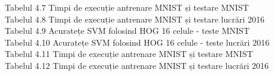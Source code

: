 \documentclass[a4paper,12pt]{report}
\begin{document}
Tabelul 4.7 \hspace{2mm} Timpi de execuție antrenare MNIST și testare MNIST\\  
Tabelul 4.8 \hspace{2mm} Timpi de execuție antrenare MNIST și testare lucrări 2016\\  
Tabelul 4.9 \hspace{2mm} Acuratețe SVM folosind HOG 16 celule - teste MNIST\\  
Tabelul 4.10 \hspace{2mm} Acuratețe SVM folosind HOG 16 celule - teste lucrări 2016\\  
Tabelul 4.11 \hspace{2mm} Timpi de execuție antrenare MNIST și testare MNIST\\  
Tabelul 4.12 \hspace{2mm} Timpi de execuție antrenare MNIST și testare lucrări 2016\\  

\chapter*{}
\end{document}

